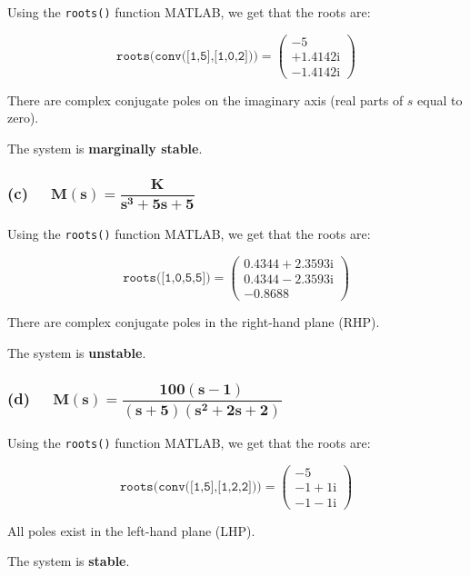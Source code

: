 \documentclass[12pt, letterpaper]{../assignment}
\begin{document}
Using the \texttt{roots()} function MATLAB, we get that the roots are:

$$ \texttt{roots(conv([1,5],[1,0,2]))} = \left(\begin{array}{c} -5\\ +1.4142{}\mathrm{i}\\ -1.4142{}\mathrm{i} \end{array}\right)$$

There are complex conjugate poles on the imaginary axis (real parts of $s$ equal to zero).

\begin{answer}
    The system is \textbf{marginally stable}.
\end{answer}

\subsubsection*{(c) \ \  $ \mathbf{ M(s) = \dfrac{K }{s^3 + 5s + 5}}$}

Using the \texttt{roots()} function MATLAB, we get that the roots are:

$$ \texttt{roots([1,0,5,5])} = \left(\begin{array}{c} 0.4344+2.3593{}\mathrm{i}\\ 0.4344-2.3593{}\mathrm{i}\\ -0.8688 \end{array}\right)$$

There are complex conjugate poles in the right-hand plane (RHP).

\begin{answer}
    The system is \textbf{unstable}.
\end{answer}

\subsubsection*{(d) \ \ $ \mathbf{ M(s) = \dfrac{100(s-1)}{(s+5)(s^2 + 2s + 2)}}$}

Using the \texttt{roots()} function MATLAB, we get that the roots are:

$$ \texttt{roots(conv([1,5],[1,2,2]))} = \left(\begin{array}{c} -5\\ -1+1{}\mathrm{i}\\ -1-1{}\mathrm{i} \end{array}\right)$$

All poles exist in the left-hand plane (LHP).

\begin{answer}
    The system is \textbf{stable}.
\end{answer}
\end{document}
